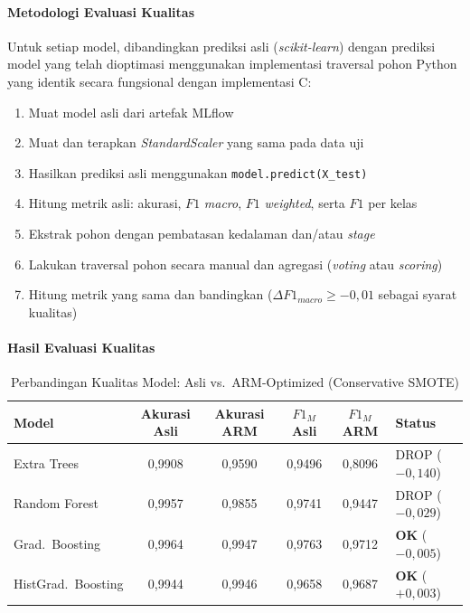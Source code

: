 \paragraph{Metodologi Evaluasi Kualitas}
Untuk setiap model, dibandingkan prediksi asli (\textit{scikit-learn}) dengan prediksi model yang telah dioptimasi menggunakan implementasi traversal pohon Python yang identik secara fungsional dengan implementasi C:

\begin{enumerate}
    \item Muat model asli dari artefak MLflow
    \item Muat dan terapkan \textit{StandardScaler} yang sama pada data uji
    \item Hasilkan prediksi asli menggunakan \texttt{model.predict(X\_test)}
    \item Hitung metrik asli: akurasi, $F1$ \textit{macro}, $F1$ \textit{weighted}, serta $F1$ per kelas
    \item Ekstrak pohon dengan pembatasan kedalaman dan/atau \textit{stage}
    \item Lakukan traversal pohon secara manual dan agregasi (\textit{voting} atau \textit{scoring})
    \item Hitung metrik yang sama dan bandingkan ($\Delta F1_{macro} \geq -0{,}01$ sebagai syarat kualitas)
\end{enumerate}

\paragraph{Hasil Evaluasi Kualitas}

\begin{table}[htbp]
\centering
\caption{Perbandingan Kualitas Model: Asli vs.\ ARM-Optimized (Conservative SMOTE)}
\label{tab:quality_comparison}
\begin{tabular}{lccccl}
\hline
\textbf{Model} & \textbf{Akurasi Asli} & \textbf{Akurasi ARM} & \textbf{$F1_M$ Asli} & \textbf{$F1_M$ ARM} & \textbf{Status} \\
\hline
Extra Trees & 0,9908 & 0,9590 & 0,9496 & 0,8096 & DROP ($-0{,}140$) \\
Random Forest & 0,9957 & 0,9855 & 0,9741 & 0,9447 & DROP ($-0{,}029$) \\
Grad.\ Boosting & 0,9964 & 0,9947 & 0,9763 & 0,9712 & \textbf{OK} ($-0{,}005$) \\
HistGrad.\ Boosting & 0,9944 & 0,9946 & 0,9658 & 0,9687 & \textbf{OK} ($+0{,}003$) \\
\hline
\end{tabular}
\end{table}

